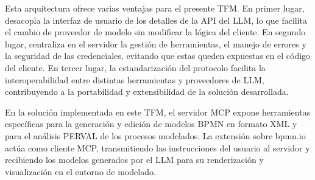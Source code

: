 Esta arquitectura ofrece varias ventajas para el presente TFM. En primer lugar, desacopla la interfaz de usuario de los detalles de la API del LLM, lo que facilita el cambio de proveedor de modelo sin modificar la lógica del cliente. En segundo lugar, centraliza en el servidor la gestión de herramientas, el manejo de errores y la seguridad de las credenciales, evitando que estas queden expuestas en el código del cliente. En tercer lugar, la estandarización del protocolo facilita la interoperabilidad entre distintas herramientas y proveedores de LLM, contribuyendo a la portabilidad y extensibilidad de la solución desarrollada.

En la solución implementada en este TFM, el servidor MCP expone herramientas específicas para la generación y edición de modelos BPMN en formato XML y para el análisis PERVAL de los procesos modelados. La extensión sobre bpmn.io actúa como cliente MCP, transmitiendo las instrucciones del usuario al servidor y recibiendo los modelos generados por el LLM para su renderización y visualización en el entorno de modelado.

